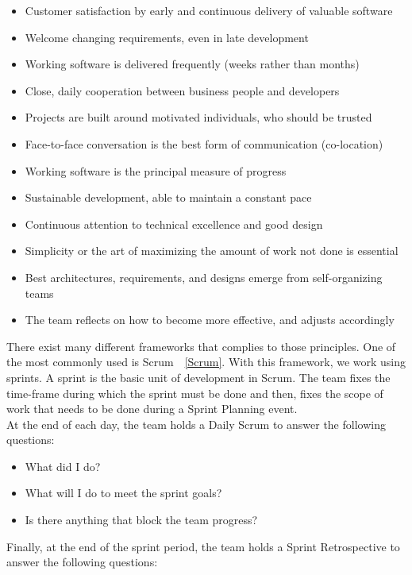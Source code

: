 \documentclass[12pt]{article}
\theoremstyle{definition}
\theoremstyle{definition}
\theoremstyle{remark}
\begin{document}
\begin{itemize}
\item Customer satisfaction by early and continuous delivery of valuable software
\item Welcome changing requirements, even in late development
\item Working software is delivered frequently (weeks rather than months)
\item Close, daily cooperation between business people and developers
\item Projects are built around motivated individuals, who should be trusted
\item Face-to-face conversation is the best form of communication (co-location)
\item Working software is the principal measure of progress
\item Sustainable development, able to maintain a constant pace
\item Continuous attention to technical excellence and good design
\item Simplicity or the art of maximizing the amount of work not done is essential
\item Best architectures, requirements, and designs emerge from self-organizing teams
\item The team reflects on how to become more effective, and adjusts accordingly
\end{itemize}

There exist many different frameworks that complies to those principles. One of the most commonly used is Scrum~\cite{ScrumAlliance:2017}~\ref{Scrum}. With this framework, we work using sprints. A sprint is the basic unit of development in Scrum. The team fixes the time-frame during which the sprint must be done and then, fixes the scope of work that needs to be done during a Sprint Planning event.\\

At the end of each day, the team holds a Daily Scrum to answer the following questions:

\begin{itemize}
\item What did I do?
\item What will I do to meet the sprint goals?
\item Is there anything that block the team progress?
\end{itemize}

Finally, at the end of the sprint period, the team holds a Sprint Retrospective to answer the following questions:
\end{document}
